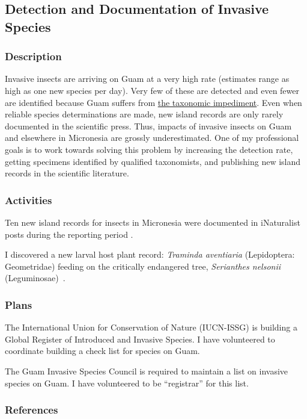 \subsection{Detection and Documentation of Invasive Species}
\begin{refsection}

\subsubsection{Description}

Invasive insects are arriving on Guam at a very high rate (estimates
range as high as one new species per day). Very few of these are detected
and even fewer are identified because Guam suffers from \href{https://en.wikipedia.org/wiki/Taxonomic_impediment}{the taxonomic impediment}.
Even when reliable species determinations are made, new island records
are only rarely documented in the scientific press. Thus, impacts
of invasive insects on Guam and elsewhere in Micronesia are grossly
underestimated. One of my professional goals is to work towards solving
this problem by increasing the detection rate, getting specimens identified
by qualified taxonomists, and publishing new island records in the
scientific literature.

\subsubsection{Activities}

Ten new island records for insects in Micronesia were documented in iNaturalist posts during the reporting period \cite{inat36470788,inat36285968,inat35845152,inat32572967,inat31326484,inat29333274,inat18166461,inat16734728,inat15747194,inat15067449,inat13466275}.

I discovered a new larval host plant record: \textit{Traminda aventiaria} (Lepidoptera: Geometridae) feeding on the critically endangered tree, \textit{Serianthes nelsonii} (Leguminosae)~\cite{moore_new_2020}.

\subsubsection{Plans}

The International Union for Conservation of Nature (IUCN-ISSG) is
building a Global Register of Introduced and Invasive Species. I have
volunteered to coordinate building a check list for species on Guam.

The Guam Invasive Species Council is required to maintain a list on
invasive species on Guam. I have volunteered to be ``registrar''
for this list.

\subsubsection{References}
\printbibliography[heading=none]
\end{refsection}

